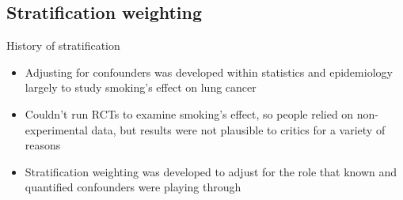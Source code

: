 \documentclass{beamer}
\begin{document}
\subsection{Stratification weighting}


\begin{frame}{History of stratification}

\begin{itemize}

	\item Adjusting for confounders was developed within statistics and epidemiology largely to study smoking's effect on lung cancer
	\item Couldn't run RCTs to examine smoking's effect, so people relied on non-experimental data, but results were not plausible to critics for a variety of reasons
	\item Stratification weighting was developed to adjust for the role that known and quantified confounders were playing through

\end{itemize}

\end{frame}
\end{document}

